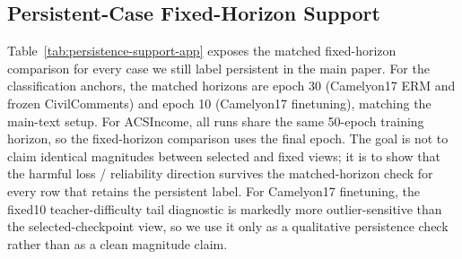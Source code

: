 \begin{table}[h]
  \centering
  \small
  \resizebox{\columnwidth}{!}{}
  \caption{
    Camelyon17 finetune selected-checkpoint per-bank robustness for the teacher-difficulty tail metric.
    The harmful tail direction remains on both banks at P95, P97, and P99.
    P95 and P97 are slightly less uniform than the ERM anchor on one of the two bankwise consistency fractions, while P99 remains fully harmful on both banks.
  }
  \label{tab:camelyon-finetune-per-bank-robustness-app}
\end{table}

\subsection{Persistent-Case Fixed-Horizon Support}
\label{app:persistence-support}
Table~\ref{tab:persistence-support-app} exposes the matched fixed-horizon comparison for every case we still label persistent in the main paper.
For the classification anchors, the matched horizons are epoch 30 (Camelyon17 ERM and frozen CivilComments) and epoch 10 (Camelyon17 finetuning), matching the main-text setup.
For ACSIncome, all runs share the same 50-epoch training horizon, so the fixed-horizon comparison uses the final epoch.
The goal is not to claim identical magnitudes between selected and fixed views; it is to show that the harmful loss / reliability direction survives the matched-horizon check for every row that retains the persistent label.
For Camelyon17 finetuning, the fixed10 teacher-difficulty tail diagnostic is markedly more outlier-sensitive than the selected-checkpoint view, so we use it only as a qualitative persistence check rather than as a clean magnitude claim.

\begin{table}[h]
  \centering
  \small
  \resizebox{\columnwidth}{!}{}
  \caption{
    Fixed-horizon support for every row still labeled persistent.
    ``Selected'' is the main-text proxy-selected comparison; ``fixed'' evaluates the same baseline/suppressive pair at the matched horizon instead of at the selected epoch.
    For ACSIncome, the matched fixed horizon is the common final epoch 50.
    $\dagger$ The finetune fixed10 teacher-difficulty tail diagnostic is outlier-sensitive: a few seeds explode at epoch 10, so we use that entry only as a qualitative persistence check rather than as a clean magnitude comparison.
  }
  \label{tab:persistence-support-app}
\end{table}

